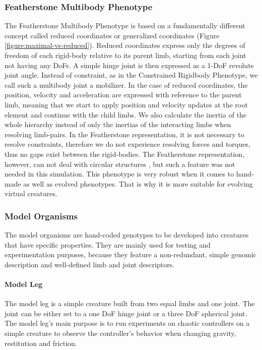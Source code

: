 \documentclass[main]{subfiles}
\begin{document}
\subsubsection{Featherstone Multibody Phenotype}
\label{subsec:featherstone-multibody}

The Featherstone Multibody Phenotype is based on a fundamentally different concept called reduced coordinates or generalized coordinates (Figure \ref{figure:maximal-vs-reduced}). %
%
Reduced coordinates express only the degrees of freedom of each rigid-body relative to its parent limb, starting from each joint not having any DoFs. %
%
A simple hinge joint is then expressed as a 1-DoF revolute joint angle. Instead of constraint, as in the Constrained Rigidbody Phenotype, we call such a multibody joint a mobilizer. %
%
In the case of reduced coordinates, the position, velocity and acceleration are expressed with reference to the parent limb, meaning that we start to apply position and velocity updates at the root element and continue with the child limbs. %
%
We also calculate the inertia of the whole hierarchy instead of only the inertias of the interacting limbs when resolving limb-pairs. %
%
In the Featherstone representation, it is not necessary to resolve constraints, therefore we do not experience resolving forces and torques, thus no gaps exist between the rigid-bodies. %
%
The Featherstone representation, however, can not deal with circular structures \cite{bib::Coumans2014}, but such a feature was not needed in this simulation. %
%
This phenotype is very robust when it comes to hand-made as well as evolved phenotypes. %
%
That is why it is more suitable for evolving virtual creatures. 

\subsubsection{Model Organisms}

The model organisms are hand-coded genotypes to be developed into creatures that have specific properties. %
%
They are mainly used for testing and experimentation purposes, because they feature a non-redundant, simple genomic description and well-defined limb and joint descriptors.

\paragraph{Model Leg}

The model leg is a simple creature built from two equal limbs and one joint. %
%
The joint can be either set to a one DoF hinge joint or a three DoF spherical joint. %
%
The model leg's main purpose is to run experiments on chaotic controllers on a simple creature to observe the controller's behavior when changing gravity, restitution and friction.
\end{document}

